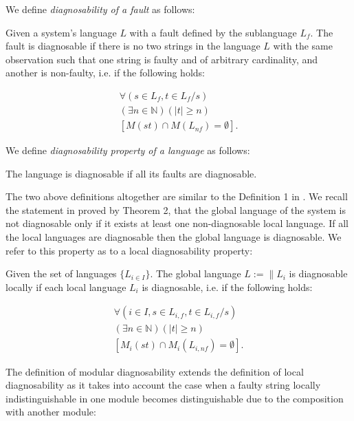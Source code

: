 We define \emph{diagnosability of a fault} as follows:
\begin{definition} 
\label{def:fault_is_diag}
Given a system's language $L$ with a fault defined by the sublanguage $L_f$. The
fault is diagnosable if there is no two strings in the language $L$ with the
same observation such that one string is faulty and of arbitrary cardinality,
and another is non-faulty, i.e. if the following holds:
\end{definition}
\begin{equation}
\begin{array}{l}
	\forall(s \in L_f, t \in L_f/s) 
	\\
	(\exists n \in \mathbb{N})
	(|t| \geq n) 
	\\
	\left[ M(st) \cap M(L_{nf}) = \emptyset \right].
\end{array}
\end{equation}

We define \emph{diagnosability property of a language} as follows:
\begin{definition}
The language is diagnosable if all its faults are diagnosable.
\end{definition}
The two above definitions altogether are similar to the Definition 1 in
\cite{sampath_diagnosability_1995}. We recall the statement in
\cite{contant_diagnosability_2006} proved by Theorem 2, that the global
language of the system is not diagnosable only if it exists at least one
non-diagnosable local language. If all the local languages are diagnosable then the global
language is diagnosable. We refer to this property as to a local diagnosability
property:

\begin{definition} Given the set of languages
$\{L_{i \in I}\}$. The global language $L := \parallel L_i$ is
diagnosable locally if each local language $L_i$ is diagnosable, i.e. if
the following holds:
\end{definition}
\begin{equation}
\begin{array}{l}
	\forall(i \in I, s \in L_{i,f}, t \in L_{i,f}/s)
	\\
	(\exists n \in \mathbb{N})
	(|t| \geq n)
	\\
	\left[ M_i(st) \cap M_i(L_{i,nf}) = \emptyset \right].
\end{array}
\end{equation}

The definition of modular diagnosability extends the definition of local
diagnosability as it takes into account the case when a faulty string locally
indistinguishable in one module becomes distinguishable due to the
composition with another module:

